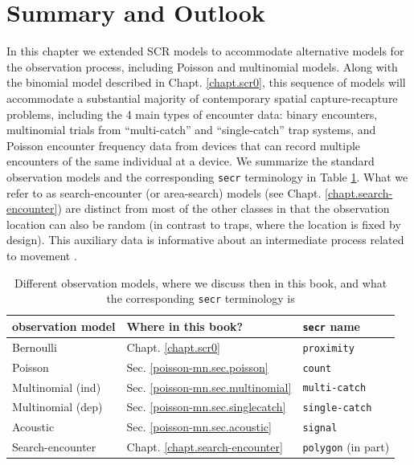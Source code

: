 \section{Summary and Outlook}

In this chapter we extended SCR models to accommodate alternative
models for the observation process, including Poisson and multinomial
models.  Along with the binomial model described in
Chapt. \ref{chapt.scr0}, this sequence of models will accommodate a
substantial majority of contemporary spatial capture-recapture
problems, including the 4 main types of encounter data: binary
encounters, multinomial trials from ``multi-catch'' and
``single-catch'' \citep{efford:2004, efford:2011, royle_gardner:2011}
trap systems, and Poisson encounter frequency data from devices that
can record multiple encounters of the same individual at a device.  We
summarize the standard observation models and the corresponding
\mbox{\tt secr} terminology in Table \ref{poisson-mn.tab.models}.
What we refer to as search-encounter (or area-search) models (see
Chapt. \ref{chapt.search-encounter}) are distinct from most of the
other classes in that the observation location can also be random (in
contrast to traps, where the location is fixed by design). This
auxiliary data is informative about an intermediate process related to
movement \citep{royle_young:2008}.

\begin{table}[ht]
\centering
\caption{
Different observation models, where we discuss then in this
  book, and what the corresponding \mbox{\tt secr} terminology is
}
\begin{tabular}{lll}
\hline \hline
observation model & Where in this book?  &  \mbox{\tt secr} name  \\ \hline
Bernoulli         & Chapt. \ref{chapt.scr0}    &   \mbox{\tt proximity} \\
Poisson           & Sec. \ref{poisson-mn.sec.poisson} & \mbox{\tt count} \\
Multinomial (ind) & Sec. \ref{poisson-mn.sec.multinomial} & \mbox{\tt  multi-catch} \\
Multinomial (dep) & Sec. \ref{poisson-mn.sec.singlecatch} & \mbox{\tt  single-catch} \\
Acoustic          & Sec. \ref{poisson-mn.sec.acoustic}
   &  \mbox{\tt signal}  \\
Search-encounter      & Chapt. \ref{chapt.search-encounter}  &
\mbox{\tt polygon} (in part) \\ \hline
\end{tabular}
\label{poisson-mn.tab.models}
\end{table}

